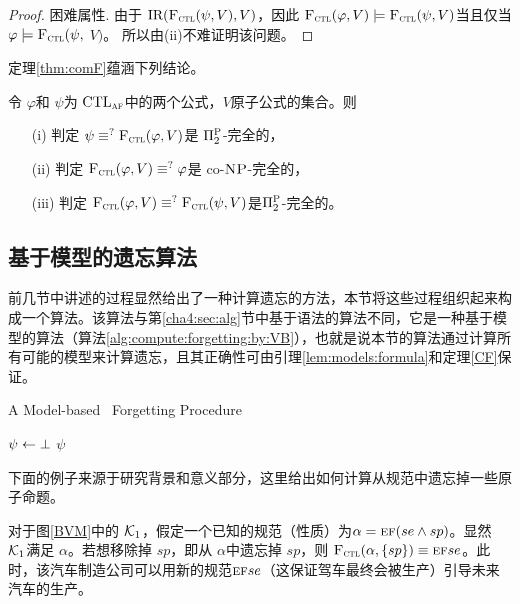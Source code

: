 \begin{proof}
	困难属性. 由于 $\textrm{IR}({\textsc{F}_{\textsc{ctl}}}(\psi, V), V)$，因此 ${\textsc{F}_{\textsc{ctl}}}(\varphi, V) \models {\textsc{F}_{\textsc{ctl}}}(\psi, V)$当且仅当 $\varphi \models {\textsc{F}_{\textsc{ctl}}}(\psi,$ $V)$。 所以由(ii)不难证明该问题。
\end{proof}



定理\ref{thm:comF}蕴涵下列结论。
\begin{corollary}
	令 $\varphi$和 $\psi$为 $\textrm{CTL}_{\textsc{a} \textsc{f}}$中的两个公式，$V$原子公式的集合。则
	\begin{itemize}
		\item[(i)] 判定 $\psi \equiv^?{\textsc{F}_{\textsc{ctl}}}(\varphi, V)$是 $\Pi_2^{\textsc{P}}$-完全的，
		\item[(ii)] 判定 ${\textsc{F}_{\textsc{ctl}}}(\varphi, V) \equiv^? \varphi$是 co-$\textsc{NP}$-完全的，
		\item[(iii)] 判定 ${\textsc{F}_{\textsc{ctl}}}(\varphi, V) \equiv^? {\textsc{F}_{\textsc{ctl}}}(\psi, V)$是$\Pi_2^{\textsc{P}}$-完全的。
	\end{itemize}
\end{corollary}


\subsection{基于模型的遗忘算法}\label{chapter06:sec:algm}
前几节中讲述的过程显然给出了一种计算遗忘的方法，本节将这些过程组织起来构成一个算法。该算法与第\ref{cha4:sec:alg}节中基于语法的算法不同，它是一种基于模型的算法（算法\ref{alg:compute:forgetting:by:VB}），也就是说本节的算法通过计算所有可能的模型来计算遗忘，且其正确性可由引理\ref{lem:models:formula}和定理\ref{CF}保证。


\begin{algorithm}[tb]
	\caption{\small A Model-based \CTL\ Forgetting Procedure}
	\label{alg:compute:forgetting:by:VB}
	\LinesNumbered
	$\psi \leftarrow \bot$\;
	\Return $\psi$\;
\end{algorithm}



下面的例子来源于研究背景和意义部分，这里给出如何计算从规范中遗忘掉一些原子命题。 
\begin{example}\label{ex:6}
	对于图\ref{BVM}中的 ${\cal K}_1$，假定一个已知的规范（性质）为$\alpha = \textsc{e}\textsc{f}(se \wedge sp)$。显然 ${\cal K}_1$满足 $\alpha$。若想移除掉 $sp$，即从 $\alpha$中遗忘掉 $sp$，则 ${\textsc{F}_{\textsc{ctl}}}(\alpha,\{ sp\}) \equiv \textsc{e}\textsc{f} se$。此时，该汽车制造公司可以用新的规范$\textsc{e}\textsc{f} se$（这保证驾车最终会被生产）引导未来汽车的生产。
\end{example}



